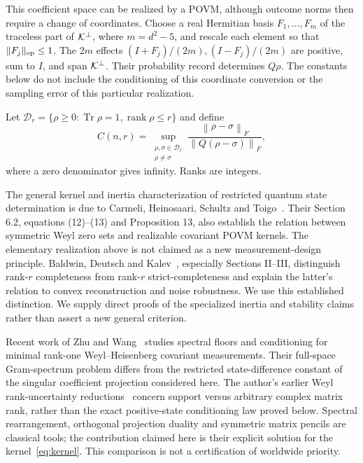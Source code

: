 \documentclass[11pt,a4paper]{article}
\theoremstyle{remark}\newtheorem{remark}[theorem]{Remark}
\DeclareMathOperator{\rank}{rank}\DeclareMathOperator{\Tr}{Tr}
\newcommand{\DD}{\mathcal D}\newcommand{\norm}[1]{\left\|#1\right\|_{\!F}}
\begin{document}
This coefficient space can be realized by a POVM, although outcome norms
then require a change of coordinates. Choose a real Hermitian basis
$F_1,\ldots,F_m$ of the traceless part of $\mathcal K^\perp$, where $m=d^2-5$,
and rescale each element so that $\|F_j\|_{\rm op}\le1$.
The $2m$ effects $(I+F_j)/(2m),(I-F_j)/(2m)$ are positive, sum to $I$,
and span $\mathcal K^\perp$. Their probability record determines $Q\rho$.
The constants below do not include the conditioning of this coordinate
conversion or the sampling error of this particular realization.

Let $\DD_r=\{\rho\ge0:\Tr\rho=1,\rank\rho\le r\}$ and define
\begin{equation}\label{eq:C}
 C(n,r)=\sup_{\substack{\rho,\sigma\in\DD_r\\\rho\ne\sigma}}
       \frac{\norm{\rho-\sigma}}{\norm{Q(\rho-\sigma)}} ,
\end{equation}
where a zero denominator gives infinity. Ranks are integers.

The general kernel and inertia characterization of restricted quantum
state determination is due to Carmeli, Heinosaari, Schultz and
Toigo~\cite{carmeli}. Their Section 6.2, equations (12)--(13) and
Proposition 13, also establish the relation between symmetric Weyl zero
sets and realizable covariant POVM kernels. The elementary realization
above is not claimed as a new measurement-design principle.
Baldwin, Deutsch and Kalev~\cite{bdk}, especially
Sections II--III, distinguish rank-$r$ completeness from
rank-$r$ strict-completeness and explain the latter's relation to convex
reconstruction and noise robustness. We use this established distinction.
We supply direct proofs of the specialized inertia and stability claims
rather than assert a new general criterion.

Recent work of Zhu and Wang~\cite{zhu} studies spectral floors and
conditioning for minimal rank-one Weyl--Heisenberg covariant
measurements. Their full-space Gram-spectrum problem differs from the
restricted state-difference constant of the singular coefficient
projection considered here. The author's earlier Weyl rank-uncertainty
reductions~\cite{eriksson} concern support versus arbitrary complex
matrix rank, rather than the exact positive-state conditioning law
proved below. Spectral rearrangement, orthogonal projection duality and
symmetric matrix pencils are classical tools; the contribution claimed
here is their explicit solution for the kernel~\eqref{eq:kernel}.
This comparison is not a certification of worldwide priority.
\end{document}
